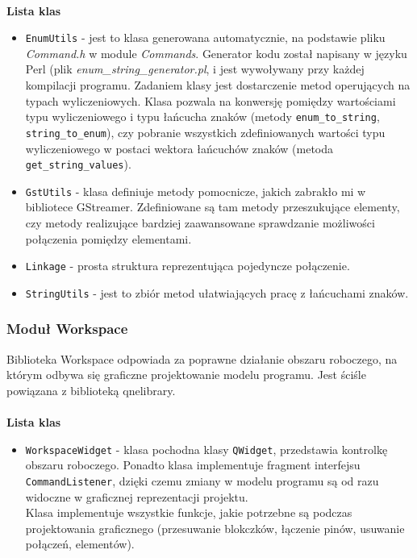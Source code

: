 \documentclass[12pt]{article}
\begin{document}
\paragraph{}
\textbf{Lista klas}
\vspace{-2mm}
\begin{itemize}
 \setlength{\itemsep}{0em}
\item \texttt{EnumUtils} - jest to klasa generowana automatycznie, na podstawie pliku \textit{Command.h} w module \textit{Commands}. Generator kodu został napisany w języku Perl (plik \textit{enum\_string\_generator.pl}, i jest wywoływany przy każdej kompilacji programu.
Zadaniem klasy jest dostarczenie metod operujących na typach wyliczeniowych. Klasa pozwala na konwersję pomiędzy wartościami typu wyliczeniowego i typu łańcucha znaków (metody \texttt{enum\_to\_string}, \texttt{string\_to\_enum}), czy pobranie wszystkich zdefiniowanych wartości typu wyliczeniowego w postaci wektora łańcuchów znaków (metoda \texttt{get\_string\_values}).
\item \texttt{GstUtils} - klasa definiuje metody pomocnicze, jakich zabrakło mi w bibliotece GStreamer. Zdefiniowane są tam metody przeszukujące elementy, czy metody realizujące bardziej zaawansowane sprawdzanie możliwości połączenia pomiędzy elementami.
\item \texttt{Linkage} - prosta struktura reprezentująca pojedyncze połączenie.
\item \texttt{StringUtils} - jest to zbiór metod ułatwiających pracę z łańcuchami znaków.
\end{itemize}
\subsubsection{Moduł Workspace}
Biblioteka Workspace odpowiada za poprawne działanie obszaru roboczego, na którym odbywa się graficzne projektowanie modelu programu. Jest ściśle powiązana z biblioteką qnelibrary.
\paragraph{}
\textbf{Lista klas}
\vspace{-2mm}
\begin{itemize}
  \setlength{\itemsep}{0em}
\item \texttt{WorkspaceWidget} - klasa pochodna klasy \texttt{QWidget}, przedstawia kontrolkę obszaru roboczego. Ponadto klasa implementuje fragment interfejsu \texttt{CommandListener}, dzięki czemu zmiany w modelu programu są od razu widoczne w graficznej reprezentacji projektu. \\
Klasa implementuje wszystkie funkcje, jakie potrzebne są podczas projektowania graficznego (przesuwanie blokczków, łączenie pinów, usuwanie połączeń, elementów).
\end{itemize}
\cleardoublepage
\end{document}
